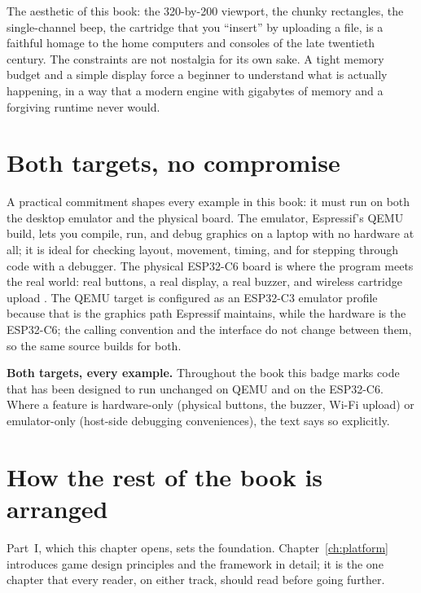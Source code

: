\begin{prgaside}
The aesthetic of this book: the 320-by-200 viewport, the chunky rectangles, the
single-channel beep, the cartridge that you ``insert'' by uploading a
 file, is a faithful homage to the home computers and consoles of
the late twentieth century. The constraints are not nostalgia for its own sake.
A tight memory budget and a simple display force a beginner to understand what is
actually happening, in a way that a modern engine with gigabytes of memory and a
forgiving runtime never would.
\end{prgaside}

\section{Both targets, no compromise}

A practical commitment shapes every example in this book: it must run on both the
desktop emulator and the physical board. The emulator, Espressif's QEMU build,
lets you compile, run, and debug graphics on a laptop with no hardware at all; it
is ideal for checking layout, movement, timing, and for stepping through code
with a debugger. The physical ESP32\nobreakdash-C6 board is where the program meets the
real world: real buttons, a real display, a real buzzer, and wireless cartridge
upload \citep{prg32qemu}. The QEMU target is configured as an ESP32\nobreakdash-C3 emulator
profile because that is the \riscv graphics path Espressif maintains, while the
hardware is the ESP32\nobreakdash-C6; the \riscv calling convention and the \prg interface
do not change between them, so the same source builds for both.

\begin{prgtargets}
\textbf{Both targets, every example.} Throughout the book this badge marks code
that has been designed to run unchanged on QEMU and on the ESP32\nobreakdash-C6. Where a
feature is hardware-only (physical buttons, the buzzer, Wi-Fi upload) or
emulator-only (host-side debugging conveniences), the text says so explicitly.
\end{prgtargets}

\section{How the rest of the book is arranged}

Part~I, which this chapter opens, sets the foundation. Chapter~\ref{ch:platform}
introduces game design principles and the \prg framework in detail; it is the one
chapter that every reader, on either track, should read before going further.

